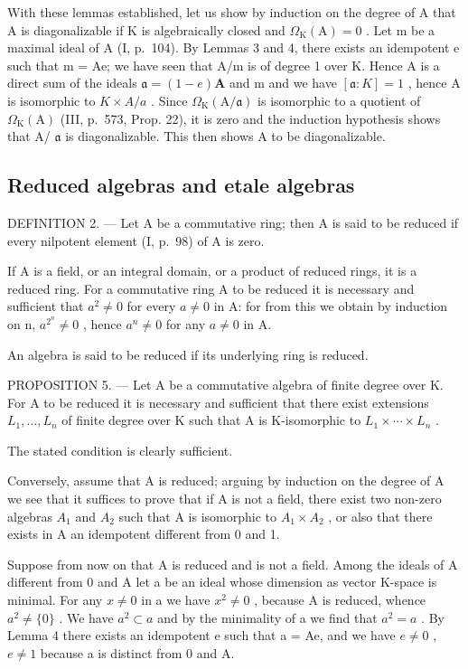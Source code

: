 With these lemmas established, let us show by induction on the degree of A that A is diagonalizable if K is algebraically closed and \(\Omega_{\mathrm{K}}(\mathrm{A})=0\) . Let m be a maximal ideal of A (I, p.~104). By Lemmas 3 and 4, there exists an idempotent e such that m = Ae; we have seen that A/m is of degree 1 over K. Hence A is a direct sum of the ideals \(\mathfrak{a}=(1-e)\mathbf{A}\) and m and we have \([\mathfrak{a}:K]=1\) , hence A is isomorphic to \(K\times A/a\) . Since \(\Omega_{\mathrm{K}}(\mathrm{A}/\mathfrak{a})\) is isomorphic to a quotient of \(\Omega_{\mathrm{K}}(\mathrm{A})\) (III, p.~573, Prop. 22), it is zero and the induction hypothesis shows that A/ \(\mathfrak{a}\) is diagonalizable. This then shows A to be diagonalizable.

\subsection{Reduced algebras and etale algebras}

DEFINITION 2. --- Let A be a commutative ring; then A is said to be reduced if every nilpotent element (I, p.~98) of A is zero.

If A is a field, or an integral domain, or a product of reduced rings, it is a reduced ring. For a commutative ring A to be reduced it is necessary and sufficient that \(a^{2} \neq 0\) for every \(a \neq 0\) in A: for from this we obtain by induction on n, \(a^{2^{n}} \neq 0\) , hence \(a^{n} \neq 0\) for any \(a \neq 0\) in A.

An algebra is said to be reduced if its underlying ring is reduced.

PROPOSITION 5. --- Let A be a commutative algebra of finite degree over K. For A to be reduced it is necessary and sufficient that there exist extensions \(L_{1}, \ldots, L_{n}\) of finite degree over K such that A is K-isomorphic to \(L_{1} \times \cdots \times L_{n}\) .

The stated condition is clearly sufficient.

Conversely, assume that A is reduced; arguing by induction on the degree of A we see that it suffices to prove that if A is not a field, there exist two non-zero algebras \(A_{1}\) and \(A_{2}\) such that A is isomorphic to \(A_{1} \times A_{2}\) , or also that there exists in A an idempotent different from 0 and 1.

Suppose from now on that A is reduced and is not a field. Among the ideals of A different from 0 and A let a be an ideal whose dimension as vector K-space is minimal. For any \(x \neq 0\) in a we have \(x^{2} \neq 0\) , because A is reduced, whence \(a^{2} \neq \{0\}\) . We have \(a^{2} \subset a\) and by the minimality of a we find that \(a^{2} = a\) . By Lemma 4 there exists an idempotent e such that a = Ae, and we have \(e \neq 0\) , \(e \neq 1\) because a is distinct from 0 and A.

